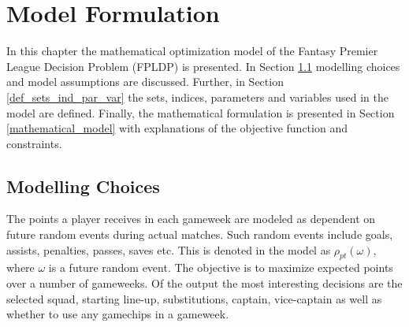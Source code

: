 
\chapter{Model Formulation} \label{chapter_model_formulation}

In this chapter the mathematical optimization model of the Fantasy Premier League Decision Problem (FPLDP) is presented. In Section \ref{modelling_choices} modelling choices and model assumptions are discussed. Further, in Section \ref{def_sets_ind_par_var} the sets, indices, parameters and variables used in the model are defined. Finally, the mathematical formulation is presented in Section \ref{mathematical_model} with explanations of the objective function and constraints. 


\section{Modelling Choices} \label{modelling_choices}

\begin{comment}
As mentioned in Section \ref{Other_Relevant_Research}, the FPLDP resembles the classic Knapsack problem. In the Knapsack problem, there is a range of items with a value and cost, and the goal is to maximize the total value meanwhile not surpass a budget. Whereas in this case there are players where their value is points and their cost is an amount predetermined by the game. The aim is to pick players such as the total amount of points is maximized while the budget is held in each gameweek. In addition, there are constraints that handle the choices of substitutes, captain and vice-captain each gameweek. The decisions on wildcard, bench boost, free hit and triple captain are also modelled. 

\end{comment}


\newpar

The points a player receives in each gameweek are modeled as dependent on future random events during actual matches. Such random events include goals, assists, penalties, passes, saves etc. This is denoted in the model as $\rho_{pt}(\omega)$, where $\omega$ is a future random event. The objective is to maximize expected points over a number of gameweeks. Of the output the most interesting decisions are the selected squad, starting line-up, substitutions, captain, vice-captain as well as whether to use any gamechips in a gameweek. 

